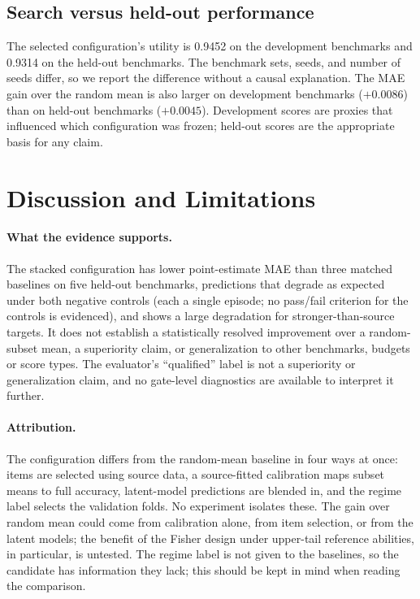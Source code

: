 \documentclass{article}
\begin{document}
\subsection{Search versus held-out performance}
The selected configuration's utility is 0.9452 on the development benchmarks and 0.9314 on the held-out benchmarks. The benchmark sets, seeds, and number of seeds differ, so we report the difference without a causal explanation. The MAE gain over the random mean is also larger on development benchmarks ($+0.0086$) than on held-out benchmarks ($+0.0045$). %
Development scores are proxies that influenced which configuration was frozen; held-out scores are the appropriate basis for any claim.

\section{Discussion and Limitations}
\label{sec:discussion}
\paragraph{What the evidence supports.} The stacked configuration has lower point-estimate MAE than three matched baselines on five held-out benchmarks, predictions that degrade as expected under both negative controls (each a single episode; no pass/fail criterion for the controls is evidenced), and shows a large degradation for stronger-than-source targets. It does not establish a statistically resolved improvement over a random-subset mean, a superiority claim, or generalization to other benchmarks, budgets or score types. The evaluator's ``qualified'' label is not a superiority or generalization claim, and no gate-level diagnostics are available to interpret it further.

\paragraph{Attribution.} The configuration differs from the random-mean baseline in four ways at once: items are selected using source data, a source-fitted calibration maps subset means to full accuracy, latent-model predictions are blended in, and the regime label selects the validation folds. No experiment isolates these. The gain over random mean could come from calibration alone, from item selection, or from the latent models; the benefit of the Fisher design under upper-tail reference abilities, in particular, is untested. The regime label is not given to the baselines, so the candidate has information they lack; this should be kept in mind when reading the comparison.
\end{document}
